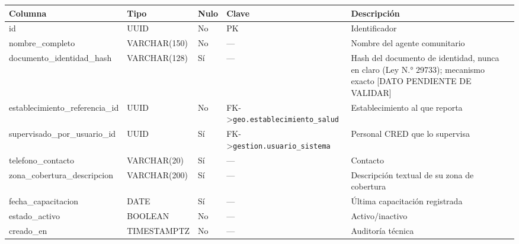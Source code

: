 \documentclass[11pt,a4paper]{article}
\begin{document}
{\small
\begin{longtable}[]{@{}
  >{\raggedright\arraybackslash}p{}
  >{\raggedright\arraybackslash}p{}
  >{\raggedright\arraybackslash}p{}
  >{\raggedright\arraybackslash}p{}
  >{\raggedright\arraybackslash}p{}@{}}
\toprule\noalign{}
\begin{minipage}[b]{\linewidth}\raggedright
Columna
\end{minipage} & \begin{minipage}[b]{\linewidth}\raggedright
Tipo
\end{minipage} & \begin{minipage}[b]{\linewidth}\raggedright
Nulo
\end{minipage} & \begin{minipage}[b]{\linewidth}\raggedright
Clave
\end{minipage} & \begin{minipage}[b]{\linewidth}\raggedright
Descripción
\end{minipage} \\
\midrule\noalign{}
\endhead
\bottomrule\noalign{}
\endlastfoot
id & UUID & No & PK & Identificador \\
nombre\_completo & VARCHAR(150) & No & --- & Nombre del agente comunitario \\
documento\_identidad\_hash & VARCHAR(128) & Sí & --- & Hash del documento de identidad, nunca en claro (Ley N.° 29733); mecanismo exacto {[}DATO PENDIENTE DE VALIDAR{]} \\
establecimiento\_referencia\_id & UUID & No & FK-\textgreater{}\texttt{geo.establecimiento\_salud} & Establecimiento al que reporta \\
supervisado\_por\_usuario\_id & UUID & Sí & FK-\textgreater{}\texttt{gestion.usuario\_sistema} & Personal CRED que lo supervisa \\
telefono\_contacto & VARCHAR(20) & Sí & --- & Contacto \\
zona\_cobertura\_descripcion & VARCHAR(200) & Sí & --- & Descripción textual de su zona de cobertura \\
fecha\_capacitacion & DATE & Sí & --- & Última capacitación registrada \\
estado\_activo & BOOLEAN & No & --- & Activo/inactivo \\
creado\_en & TIMESTAMPTZ & No & --- & Auditoría técnica \\
\end{longtable}
}
\end{document}

